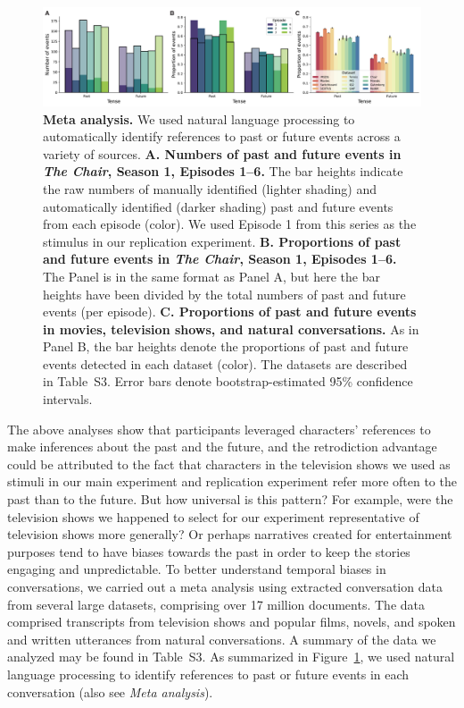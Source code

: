 \documentclass[10pt]{article}
\newcommand{\metaAnalysisDatasets}{S3}
\begin{document}
\begin{figure}[tp]
  \centering
  \includegraphics[width=\textwidth]{meta-analysis}

\caption{\textbf{Meta analysis.} We used natural language processing to automatically identify references to past or future events across a variety of sources. \textbf{A. Numbers of past and future events in \textit{The Chair}, Season 1, Episodes 1--6.} The bar heights indicate the raw numbers of manually identified (lighter shading) and automatically identified (darker shading) past and future events from each episode (color). We used Episode 1 from this series as the stimulus in our replication experiment. \textbf{B. Proportions of past and future events in \textit{The Chair}, Season 1, Episodes 1--6.} The Panel is in the same format as Panel A, but here the bar heights have been divided by the total numbers of past and future events (per episode). \textbf{C. Proportions of past and future events in movies, television shows, and natural conversations.} As in Panel B, the bar heights denote the proportions of past and future events detected in each dataset (color). The datasets are described in Table~\metaAnalysisDatasets. Error bars denote bootstrap-estimated 95\% confidence intervals.}
  
  \label{fig:meta-analysis}
\end{figure}

The above analyses show that participants leveraged characters' references to make inferences about the past and the future, and the retrodiction advantage could be attributed to the fact that characters in the television shows we used as stimuli in our main experiment and replication experiment refer more often to the past than to the future. But how universal is this pattern? For example, were the television shows we happened to select for our experiment representative of television shows more generally? Or perhaps narratives created for entertainment purposes tend to have biases towards the past in order to keep the stories engaging and unpredictable. To better understand temporal biases in conversations, we carried out a meta analysis using extracted conversation data from several large datasets, comprising over 17 million documents. The data comprised transcripts from television shows and popular films, novels, and spoken and written utterances from natural conversations. A summary of the data we analyzed may be found in Table~\metaAnalysisDatasets. As summarized in Figure~\ref{fig:meta-analysis}, we used natural language processing to identify references to past or future events in each conversation (also see \textit{Meta analysis}).
\end{document}
